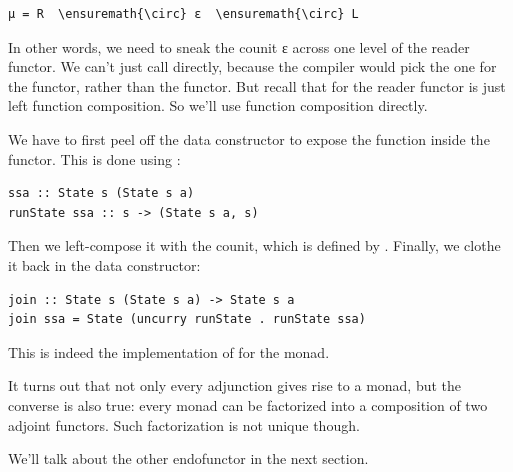 \begin{Verbatim}[commandchars=\\\{\}]
μ = R  \ensuremath{\circ} ε  \ensuremath{\circ} L
\end{Verbatim}
In other words, we need to sneak the counit ε across one level of the
reader functor. We can't just call  directly, because the
compiler would pick the one for the  functor, rather than
the  functor. But recall that  for the
reader functor is just left function composition. So we'll use function
composition directly.

We have to first peel off the data constructor  to expose
the function inside the  functor. This is done using
:

\begin{Verbatim}[commandchars=\\\{\}]
ssa :: State s (State s a)
runState ssa :: s -> (State s a, s)
\end{Verbatim}
Then we left-compose it with the counit, which is defined by
. Finally, we clothe it back in the
 data constructor:

\begin{Verbatim}[commandchars=\\\{\}]
join :: State s (State s a) -> State s a
join ssa = State (uncurry runState . runState ssa)
\end{Verbatim}
This is indeed the implementation of  for the
 monad.

It turns out that not only every adjunction gives rise to a monad, but
the converse is also true: every monad can be factorized into a
composition of two adjoint functors. Such factorization is not unique
though.

We'll talk about the other endofunctor  in the next
section.